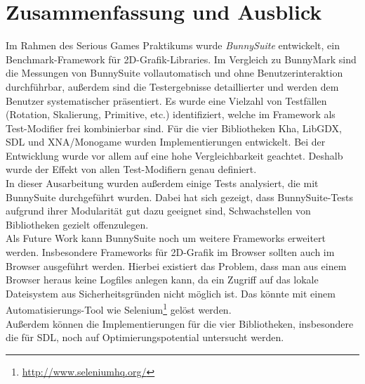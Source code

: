\chapter{Zusammenfassung und Ausblick}
Im Rahmen des Serious Games Praktikums wurde \textit{BunnySuite} entwickelt, ein Benchmark-Framework für 2D-Grafik-Libraries. Im Vergleich zu BunnyMark sind die Messungen von BunnySuite vollautomatisch und ohne Benutzerinteraktion durchführbar, außerdem sind die Testergebnisse detaillierter und werden dem Benutzer systematischer präsentiert. Es wurde eine Vielzahl von Testfällen (Rotation, Skalierung, Primitive, etc.) identifiziert, welche im Framework als Test-Modifier frei kombinierbar sind. Für die vier Bibliotheken Kha, LibGDX, SDL und XNA/Monogame wurden Implementierungen entwickelt. Bei der Entwicklung wurde vor allem auf eine hohe Vergleichbarkeit geachtet. Deshalb wurde der Effekt von allen Test-Modifiern genau definiert.\\
In dieser Ausarbeitung wurden außerdem einige Tests analysiert, die mit BunnySuite durchgeführt wurden. Dabei hat sich gezeigt, dass BunnySuite-Tests aufgrund ihrer Modularität gut dazu geeignet sind, Schwachstellen von Bibliotheken gezielt offenzulegen. 
\\
Als Future Work kann BunnySuite noch um weitere Frameworks erweitert werden. Insbesondere Frameworks für 2D-Grafik im Browser sollten auch im Browser ausgeführt werden. Hierbei existiert das Problem, dass man aus einem Browser heraus keine Logfiles anlegen kann, da ein Zugriff auf das lokale Dateisystem aus Sicherheitsgründen nicht möglich ist. Das könnte mit einem Automatisierungs-Tool wie Selenium\footnote{\url{http://www.seleniumhq.org/}} gelöst werden.\\
Außerdem können die Implementierungen für die vier Bibliotheken, insbesondere die für SDL, noch auf Optimierungspotential untersucht werden.

